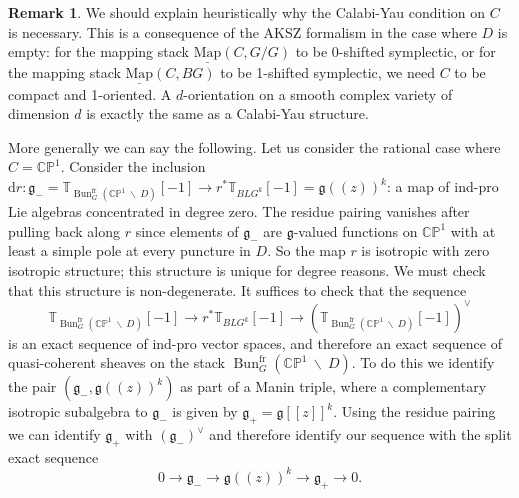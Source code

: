 \documentclass[11pt, oneside, reqno]{amsart}
\theoremstyle{definition} \newtheorem{definition}{Definition}[section]
\theoremstyle{definition} \newtheorem{remark}[definition]{Remark}
\theoremstyle{definition} \newtheorem{remarks}[definition]{Remarks}
\theoremstyle{definition} \newtheorem{question}[definition]{Question}
\theoremstyle{definition} \newtheorem*{note}{Note}
\theoremstyle{definition} \newtheorem{example}[definition]{Example}
\theoremstyle{definition} \newtheorem{examples}[definition]{Examples}
\renewcommand{\gg}{\mathfrak{g}}
\newcommand{\bb}[1]{\mathbb{#1}}
\newcommand{\mr}[1]{\mathrm{#1}}
\newcommand{\bs}{\ \backslash \ }
\newcommand{\ul}[1]{\underline{#1}}
\DeclareMathOperator{\bun}{Bun}
\newcommand{\map}{\ul{\mr{Map}}}
\renewcommand{\d}{\mathrm{d}}
\newcommand{\fr}{\mathrm{fr}}
\begin{document}
\begin{remark}
We should explain heuristically why the Calabi-Yau condition on $C$ is necessary.  This is a consequence of the AKSZ formalism in the case where $D$ is empty: for the mapping stack $\map(C, G/G)$ to be 0-shifted symplectic, or for the mapping stack $\map(C,BG)$ to be 1-shifted symplectic, we need $C$ to be compact and 1-oriented.  A $d$-orientation on a smooth complex variety of dimension $d$ is exactly the same as a Calabi-Yau structure.

More generally we can say the following.  Let us consider the rational case where $C = \bb{CP}^1$.  Consider the inclusion $\d r \colon \gg_- = \bb T_{\bun_G^\fr(\bb{CP}^1 \! \bs \! D)}[-1] \to r^*\bb T_{BLG^k}[-1] = \gg(\!(z)\!)^k$: a map of ind-pro Lie algebras concentrated in degree zero.  The residue pairing vanishes after pulling back along $r$ since elements of $\gg_-$ are  $\gg$-valued functions on $\bb{CP}^1$ with at least a simple pole at every puncture in $D$.  So the map $r$ is isotropic with zero isotropic structure; this structure is unique for degree reasons.  We must check that this structure is non-degenerate.  It suffices to check that the sequence
\[\bb T_{\bun_G^\fr(\bb{CP}^1 \! \bs \! D)}[-1] \to r^*\bb T_{BLG^k}[-1] \to (\bb T_{\bun_G^\fr(\bb{CP}^1 \! \bs \! D)}[-1])^\vee\]
is an exact sequence of ind-pro vector spaces, and therefore an exact sequence of quasi-coherent sheaves on the stack $\bun_G^\fr(\bb{CP}^1 \! \bs \! D)$.  To do this we identify the pair $(\gg_-, \gg(\!(z)\!)^k)$ as part of a Manin triple, where a complementary isotropic subalgebra to $\gg_-$ is given by $\gg_+ = \gg[[z]]^k$.  Using the residue pairing we can identify $\gg_+$ with $(\gg_-)^\vee$ and therefore identify our sequence with the split exact sequence
\[0 \to \gg_- \to \gg(\!(z)\!)^k \to \gg_+ \to 0.\]
\end{remark}
\end{document}
